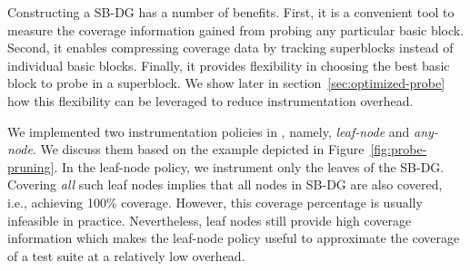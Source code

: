 Constructing a SB-DG has a number of benefits.
First, it is a convenient tool to measure the coverage information gained from probing any particular basic block.
Second, it enables compressing coverage data by tracking superblocks instead of individual basic blocks.
Finally, it provides flexibility in choosing the best basic block to probe in a superblock. 
We show later in section~\ref{sec:optimized-probe} how this flexibility can be leveraged to reduce instrumentation overhead.

We implemented two instrumentation policies in {\bcov}, namely, \textit{leaf-node} and \textit{any-node}.
We discuss them based on the example depicted in Figure~\ref{fig:probe-pruning}.
In the leaf-node policy, we instrument only the leaves of the SB-DG.
Covering \textit{all} such leaf nodes implies that all nodes in SB-DG are also covered, i.e., achieving 100\% coverage.
However, this coverage percentage is usually infeasible in practice.
Nevertheless, leaf nodes still provide high coverage information which makes the leaf-node policy useful to approximate the coverage of a test suite at a relatively low overhead. 



